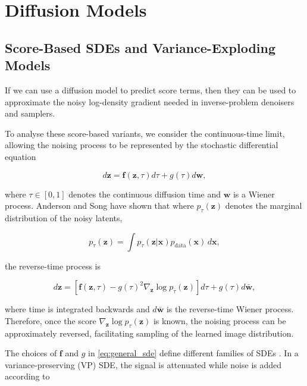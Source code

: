 \section{Diffusion Models}
\label{sec:diffusion_models}

\subsection{Score-Based SDEs and Variance-Exploding Models}
\label{sec:score_based_sdes}

If we can use a diffusion model to predict score terms, then they can be used to approximate the noisy log-density gradient needed in inverse-problem denoisers and samplers.

To analyse these score-based variants, we consider the continuous-time limit, allowing the noising process to be represented by the stochastic differential equation

\begin{equation}
d\mathbf{z}=\mathbf{f}(\mathbf{z},\tau)d\tau+g(\tau)d\mathbf{w},
\label{eq:general_sde}
\end{equation}

where $\tau\in [0,1]$ denotes the continuous diffusion time and $\mathbf{w}$ is a Wiener process. Anderson and Song \cite{anderson_reverse-time_1982,song_score-based_2020-1} have shown that where $p_\tau(\mathbf{z})$ denotes the marginal distribution of the noisy latents,

\begin{equation}
p_\tau(\mathbf{z})=\int p_\tau (\mathbf{z}|\mathbf{x})p_{\mathrm{data}}(\mathbf{x})\, d\mathbf{x},
\label{eq:marginal}
\end{equation}

the reverse-time process is

\begin{equation}
d\mathbf{z}=\left[\mathbf{f}(\mathbf{z},\tau)-g(\tau)^2\nabla_{\mathbf{z}}\log p_\tau(\mathbf{z})\right]d\tau+g(\tau)d\bar{\mathbf{w}},
\label{eq:reverse_time_sde}
\end{equation}

where time is integrated backwards and $d\bar {\mathbf{w}}$ is the reverse-time Wiener process. Therefore, once the score $\nabla_\mathbf{z} \log p_\tau(\mathbf{z})$ is known, the noising process can be approximately reversed, facilitating sampling of the learned image distribution.

The choices of $\mathbf{f}$ and $g$ in \eqref{eq:general_sde} define different families of SDEs \cite{song_score-based_2020-1}. In a variance-preserving (VP) SDE, the signal is attenuated while noise is added according to

